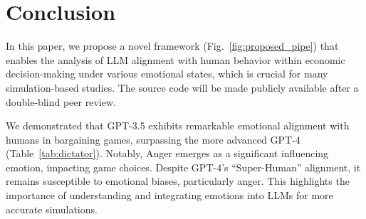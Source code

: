 \documentclass{article}
\begin{document}
\section{Conclusion}\label{sec:conclusion}



In this paper, we propose a novel framework (Fig.~\ref{fig:proposed_pipe}) that enables the analysis of LLM alignment with human behavior within economic decision-making under various emotional states, which is crucial for many simulation-based studies. The source code will be made publicly available after a double-blind peer review.

We demonstrated that GPT-3.5 exhibits remarkable emotional alignment with humans in bargaining games, surpassing the more advanced GPT-4 (Table~\ref{tab:dictator}). Notably, Anger emerges as a significant influencing emotion, impacting game choices. Despite GPT-4's ``Super-Human'' alignment, it remains susceptible to emotional biases, particularly anger. %
This highlights the importance of understanding and integrating emotions into LLMs for more accurate simulations.
\end{document}
